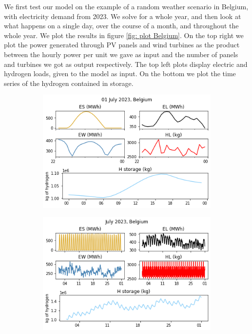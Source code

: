 \documentclass[english]{article}
\numberwithin{definition}{section}
\numberwithin{theorem}{section}
\numberwithin{problem}{section}
\begin{document}
We first test our model on the example of a random weather scenario in Belgium, with electricity demand from 2023. We solve for a whole year, and then look at what happens on a single day, over the course of a month, and throughout the whole year. We plot the results in figure \ref{fig: plot Belgium}. On the top right we plot the power generated through PV panels and wind turbines as the product between the hourly power per unit we gave as input and the number of panels and turbines we got as output respectively. The top left plots display electric and hydrogen loads, given to the model as input. On the bottom we plot the time series of the hydrogen contained in storage.


\begin{figure}[H]
\centering
\begin{subfigure}{.30\textwidth}
  \centering
  \includegraphics[width=\linewidth]{immagini/Single_node/Belgium_01_07.png}
\end{subfigure}%
\quad
\begin{subfigure}{.30\textwidth}
  \centering
  \includegraphics[width=\linewidth]{immagini/Single_node/Belgium_07.png}

\end{subfigure}
\end{figure}
\end{document}
